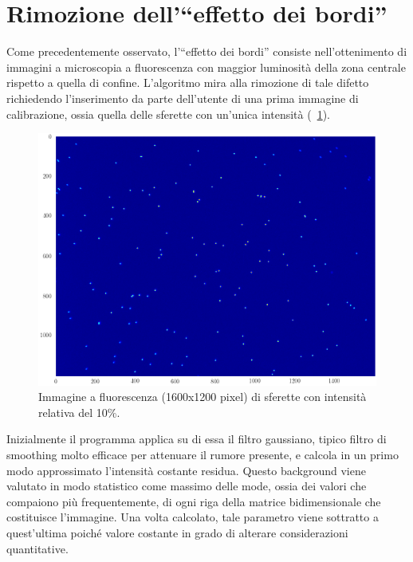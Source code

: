 \section{Rimozione dell'``effetto dei bordi''}

Come precedentemente osservato, l'``effetto dei bordi'' consiste nell'ottenimento di immagini a microscopia a fluorescenza con maggior luminosità della zona centrale rispetto a quella di confine. 
L'algoritmo mira alla rimozione di tale difetto richiedendo l'inserimento da parte dell'utente di una prima immagine di calibrazione, ossia quella delle sferette con un'unica intensità (\figurename~\ref{fig:unaint}).

\begin{figure}
 \centering
 \includegraphics[scale=.60]{img/CAP3unaint.png}
 \caption{\small{Immagine a fluorescenza (1600x1200 pixel) di sferette con intensità relativa del 10\%.}}
 \label{fig:unaint}
\end{figure}

Inizialmente il programma applica su di essa il filtro gaussiano, tipico filtro di smoothing molto efficace per attenuare il rumore presente, e calcola in un primo modo approssimato l'intensità costante residua.
Questo background viene valutato in modo statistico come massimo delle mode, ossia dei valori che compaiono più frequentemente, di ogni riga della matrice bidimensionale che costituisce l'immagine. 
Una volta calcolato, tale parametro viene sottratto a quest'ultima poiché valore costante in grado di alterare considerazioni quantitative.

